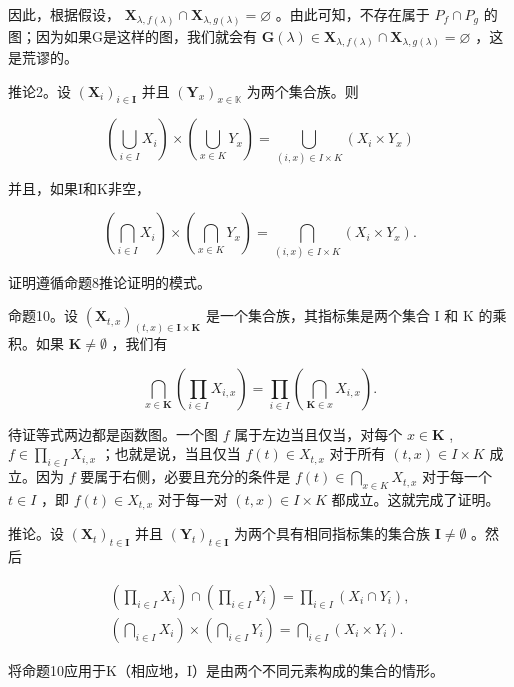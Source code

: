因此，根据假设， \(\mathbf{X}_{\lambda,f(\lambda)} \cap \mathbf{X}_{\lambda,g(\lambda)} = \varnothing\) 。由此可知，不存在属于 \(P_{f} \cap P_{g}\) 的图；因为如果G是这样的图，我们就会有 \(\mathbf{G}(\lambda) \in \mathbf{X}_{\lambda,f(\lambda)} \cap \mathbf{X}_{\lambda,g(\lambda)} = \varnothing\) ，这是荒谬的。

推论2。设 \((\mathbf{X}_i)_{i\in \mathbf{I}}\) 并且 \((\mathbf{Y}_x)_{x\in \mathbb{K}}\) 为两个集合族。则

\[
\left(\bigcup_ {i \in I} X _ {i}\right) \times \left(\bigcup_ {x \in K} Y _ {x}\right) = \bigcup_ {(i, x) \in I \times K} (X _ {i} \times Y _ {x})
\]

并且，如果I和K非空，

\[
\left(\bigcap_ {i \in I} X _ {i}\right) \times \left(\bigcap_ {x \in K} Y _ {x}\right) = \bigcap_ {(i, x) \in I \times K} (X _ {i} \times Y _ {x}).
\]

证明遵循命题8推论证明的模式。

命题10。设 \((\mathbf{X}_{t,x})_{(t,x)\in \mathbf{I}\times \mathbf{K}}\) 是一个集合族，其指标集是两个集合 I 和 K 的乘积。如果 \(\mathbf{K}\neq \emptyset\) ，我们有

\[
\bigcap_ {x \in \mathbf {K}} \left(\prod_ {i \in I} X _ {i, x}\right) = \prod_ {i \in I} \left(\bigcap_ {\mathbf {K} \in x} X _ {i, x}\right).
\]

待证等式两边都是函数图。一个图 \(f\) 属于左边当且仅当，对每个 \(x \in \mathbf{K}\) , \(f \in \prod_{i \in I} X_{i,x}\) ；也就是说，当且仅当 \(f(t) \in X_{t,x}\) 对于所有 \((t,x) \in I \times K\) 成立。因为 \(f\) 要属于右侧，必要且充分的条件是 \(f(t) \in \bigcap_{x \in K} X_{t,x}\) 对于每一个 \(t \in I\) ，即 \(f(t) \in X_{t,x}\) 对于每一对 \((t, x) \in I \times K\) 都成立。这就完成了证明。

推论。设 \((\mathbf{X}_t)_{t\in \mathbf{I}}\) 并且 \((\mathbf{Y}_t)_{t\in \mathbf{I}}\) 为两个具有相同指标集的集合族 \(\mathbf{I}\neq \emptyset\) 。然后

\[
\begin{array}{l} \left(\prod_ {i \in I} X _ {i}\right) \cap \left(\prod_ {i \in I} Y _ {i}\right) = \prod_ {i \in I} (X _ {i} \cap Y _ {i}), \\ \left(\bigcap_ {i \in I} X _ {i}\right) \times \left(\bigcap_ {i \in I} Y _ {i}\right) = \bigcap_ {i \in I} (X _ {i} \times Y _ {i}). \end{array}
\]

将命题10应用于K（相应地，I）是由两个不同元素构成的集合的情形。

